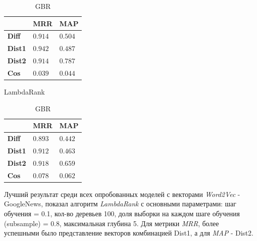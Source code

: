 \begin{table}[!htb]

\begin{minipage}{.5\textwidth}
\centering
\begin{tabular}{|l|l|l|}
\hline
 & \textbf{MRR} & \textbf{MAP} \\

\hline
\textbf{Diff} & $0.914$ & $0.504$\\

\hline
\textbf{Dist1} & $0.942$ & $0.487$\\

\hline
\textbf{Dist2} & $0.914$ & $0.787$\\

\hline
\textbf{Cos} & $0.039$ & $0.044$\\

\hline
\end{tabular}
\caption{LambdaRank}
\label{tabular:LambdaRank}
\end{minipage}%
\begin{minipage}{.5\textwidth}
\centering
\begin{tabular}{|l|l|l|}
\hline
 & \textbf{MRR} & \textbf{MAP} \\

\hline
\textbf{Diff} & $0.893$ & $0.442$\\

\hline
\textbf{Dist1} & $0.912$ & $0.463$\\

\hline
\textbf{Dist2} & $0.918$ & $0.659$\\

\hline
\textbf{Cos} & $0.078$ & $0.062$\\

\hline
\end{tabular}
\caption{GBR}
\label{tabular:GBR}
\end{minipage}

\end{table}


Лучший результат среди всех опробованных моделей с векторами \textit{Word2Vec} - GoogleNews,
показал алгоритм \textit{LambdaRank} с основными параметрами: шаг обучения = 0.1, кол-во
деревьев 100, доля выборки на каждом шаге обучения (subsample) = 0.8, максимальная
глубина 5. Для метрики \textit{MRR}, более успешными было представление векторов
комбинацией Dist1, а для \textit{MAP} - Dist2.

